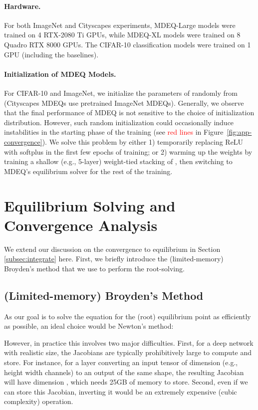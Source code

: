 \documentclass{article}
\begin{document}
\vspace{-.1in}
\paragraph{Hardware.} For both ImageNet and Cityscapes experiments, MDEQ-Large models were trained on 4 RTX-2080 Ti GPUs, while MDEQ-XL models were trained on 8 Quadro RTX 8000 GPUs. The CIFAR-10 classification models were trained on 1 GPU (including the baselines).

\vspace{-.1in}
\paragraph{Initialization of MDEQ Models.} For CIFAR-10 and ImageNet, we initialize the parameters of  randomly from  (Cityscapes MDEQs use pretrained ImageNet MDEQs). Generally, we observe that the final performance of MDEQ is not sensitive to the choice of initialization distribution. However, such random initialization could occasionally induce instabilities in the starting phase of the training (see \textcolor{red}{red lines} in Figure~\ref{fig:app-convergence}). We solve this problem by either 1) temporarily replacing ReLU with softplus in the first few epochs of training; or 2) warming up the weights by training a shallow (e.g., 5-layer) weight-tied stacking of , then switching to MDEQ's equilibrium solver for the rest of the training.


\section{Equilibrium Solving and Convergence Analysis}
\label{app:convergence}

We extend our discussion on the convergence to equilibrium in Section \ref{subsec:integrate} here. First, we briefly introduce the (limited-memory) Broyden's method that we use to perform the root-solving.

\subsection{(Limited-memory) Broyden's Method}
\label{app:broyden}

As our goal is to solve the equation  for the (root) equilibrium point  as efficiently as possible, an ideal choice would be Newton's method:

However, in practice this involves two major difficulties. First, for a deep network with realistic size, the Jacobians are typically prohibitively large to compute and store. For instance, for a layer converting an input tensor of dimension  (e.g., height  width  channels) to an output of the same shape, the resulting Jacobian will have dimension , which needs 25GB of memory to store. Second, even if we can store this Jacobian, inverting it would be an extremely expensive (cubic complexity) operation.
\end{document}
